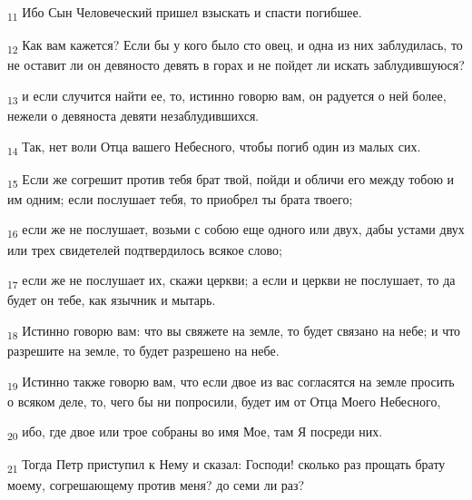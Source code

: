 \begin{tcolorbox}
\textsubscript{11} Ибо Сын Человеческий пришел взыскать и спасти погибшее.
\end{tcolorbox}
\begin{tcolorbox}
\textsubscript{12} Как вам кажется? Если бы у кого было сто овец, и одна из них заблудилась, то не оставит ли он девяносто девять в горах и не пойдет ли искать заблудившуюся?
\end{tcolorbox}
\begin{tcolorbox}
\textsubscript{13} и если случится найти ее, то, истинно говорю вам, он радуется о ней более, нежели о девяноста девяти незаблудившихся.
\end{tcolorbox}
\begin{tcolorbox}
\textsubscript{14} Так, нет воли Отца вашего Небесного, чтобы погиб один из малых сих.
\end{tcolorbox}
\begin{tcolorbox}
\textsubscript{15} Если же согрешит против тебя брат твой, пойди и обличи его между тобою и им одним; если послушает тебя, то приобрел ты брата твоего;
\end{tcolorbox}
\begin{tcolorbox}
\textsubscript{16} если же не послушает, возьми с собою еще одного или двух, дабы устами двух или трех свидетелей подтвердилось всякое слово;
\end{tcolorbox}
\begin{tcolorbox}
\textsubscript{17} если же не послушает их, скажи церкви; а если и церкви не послушает, то да будет он тебе, как язычник и мытарь.
\end{tcolorbox}
\begin{tcolorbox}
\textsubscript{18} Истинно говорю вам: что вы свяжете на земле, то будет связано на небе; и что разрешите на земле, то будет разрешено на небе.
\end{tcolorbox}
\begin{tcolorbox}
\textsubscript{19} Истинно также говорю вам, что если двое из вас согласятся на земле просить о всяком деле, то, чего бы ни попросили, будет им от Отца Моего Небесного,
\end{tcolorbox}
\begin{tcolorbox}
\textsubscript{20} ибо, где двое или трое собраны во имя Мое, там Я посреди них.
\end{tcolorbox}
\begin{tcolorbox}
\textsubscript{21} Тогда Петр приступил к Нему и сказал: Господи! сколько раз прощать брату моему, согрешающему против меня? до семи ли раз?
\end{tcolorbox}
